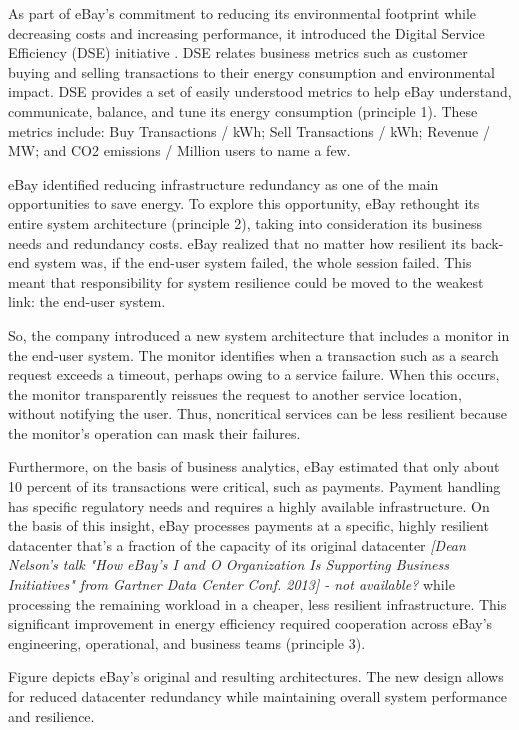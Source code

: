 As part of eBay's commitment to reducing its environmental footprint while decreasing costs and increasing performance, it introduced the Digital Service Efficiency (DSE) initiative \cite{ebay2013-digitalefficiency}. DSE relates business metrics such as customer buying and selling transactions to their energy consumption and environmental impact. DSE provides a set of easily understood metrics to help eBay understand, communicate, balance, and tune its energy consumption (principle 1). These metrics include: Buy Transactions / kWh; Sell Transactions / kWh; Revenue / MW; and CO2 emissions / Million users to name a few.

eBay identified reducing infrastructure redundancy as one of the main opportunities to save energy. To explore this opportunity, eBay rethought its entire system architecture (principle 2), taking into consideration its business needs and redundancy costs. eBay realized that no matter how resilient its back-end system was, if the end-user system failed, the whole session failed. This meant that responsibility for system resilience could be moved to the weakest link: the end-user system.

So, the company introduced a new system architecture that includes a monitor in the end-user system. The monitor identifies when a transaction such as a search request exceeds a timeout, perhaps owing to a service failure. When this occurs, the monitor transparently reissues the request to another service location, without notifying the user. Thus, noncritical services can be less resilient because the monitor's operation can mask their failures.

Furthermore, on the basis of business analytics, eBay estimated that only about 10 percent of its transactions were critical, such as payments. Payment handling has specific regulatory needs and requires a highly available infrastructure. On the basis of this insight, eBay processes payments at a specific, highly resilient datacenter that's a fraction of the capacity of its original datacenter \emph{[Dean Nelson's talk "How eBay's I and O Organization Is Supporting Business Initiatives" from Gartner Data Center Conf. 2013] - not available?} while processing the remaining workload in a cheaper, less resilient infrastructure. This significant improvement in energy efficiency required cooperation across eBay's engineering, operational, and business teams (principle 3).

Figure \cite{figure:styles} depicts eBay's original and resulting architectures. The new design allows for reduced datacenter redundancy while maintaining overall system performance and resilience.


